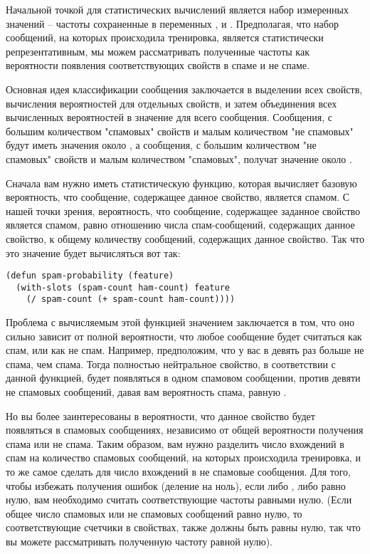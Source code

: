 Начальной точкой для статистических вычислений является набор измеренных значений --
частоты сохраненные в переменных ,  и
.  Предполагая, что набор сообщений, на которых происходила тренировка,
является статистически репрезентативным, мы можем рассматривать полученные частоты как
вероятности появления соответствующих свойств в спаме и не спаме.

Основная идея классификации сообщения заключается в выделении всех свойств, вычисления
вероятностей для отдельных свойств, и затем объединения всех вычисленных вероятностей в
значение для всего сообщения.  Сообщения, с большим количеством "спамовых" свойств и малым
количеством "не спамовых" будут иметь значения около , а сообщения, с большим
количеством "не спамовых" свойств и малым количеством "спамовых", получат значение около
.

Сначала вам нужно иметь статистическую функцию, которая вычисляет базовую вероятность, что
сообщение, содержащее данное свойство, является спамом.  С нашей точки зрения,
вероятность, что сообщение, содержащее заданное свойство является спамом, равно отношению
числа спам-сообщений, содержащих данное свойство, к общему количеству сообщений,
содержащих данное свойство.  Так что это значение будет вычисляться вот так:

\begin{lstlisting}
(defun spam-probability (feature)
  (with-slots (spam-count ham-count) feature
    (/ spam-count (+ spam-count ham-count))))
\end{lstlisting}

Проблема с вычисляемым этой функцией значением заключается в том, что оно сильно зависит
от полной вероятности, что любое сообщение будет считаться как спам, или как не спам.
Например, предположим, что у вас в девять раз больше не спама, чем спама.  Тогда полностью
нейтральное свойство, в соответствии с данной функцией, будет появляться в одном спамовом
сообщении, против девяти не спамовых сообщений, давая вам вероятность спама, равную
.

Но вы более заинтересованы в вероятности, что данное свойство будет появляться в спамовых
сообщениях, независимо от общей вероятности получения спама или не спама.  Таким образом,
вам нужно разделить число вхождений в спам на количество спамовых сообщений, на которых
происходила тренировка, и то же самое сделать для число вхождений в не спамовые сообщения.
Для того, чтобы избежать получения ошибок  (деление на ноль), если
либо , либо  равно нулю, вам необходимо считать
соответствующие частоты равными нулю. (Если общее число спамовых или не спамовых сообщений
равно нулю, то соответствующие счетчики в свойствах, также должны быть равны нулю, так что
вы можете рассматривать полученную частоту равной нулю).

